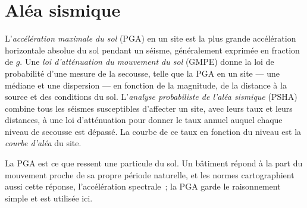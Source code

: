 \section{Aléa sismique}\label{sec:b2:geological-hazards:seismic}

\begin{definition}\label{def:b2:geological-hazards:psha}
L'\emph{accélération maximale du sol} (PGA) en un site
est la plus grande accélération horizontale absolue du sol pendant un séisme, généralement
exprimée en fraction de $g$. Une \emph{loi d'atténuation du mouvement du sol}
(GMPE) donne la loi de probabilité d'une mesure de la
secousse, telle que la PGA en un site --- une médiane et une dispersion --- en fonction de la
magnitude, de la distance à la source et des conditions du sol. L'\emph{analyse probabiliste
de l'aléa sismique} (PSHA) combine tous
les séismes susceptibles d'affecter un site, avec leurs taux et leurs distances, à une loi
d'atténuation pour donner le taux annuel auquel chaque niveau de secousse est dépassé. La courbe
de ce taux en fonction du niveau est la \emph{courbe d'aléa} du site.
\end{definition}

La PGA est ce que ressent une particule du sol. Un bâtiment répond à la part du mouvement
proche de sa propre période naturelle, et les normes cartographient aussi cette réponse,
l'accélération spectrale~; la PGA garde le raisonnement simple et est utilisée ici.

